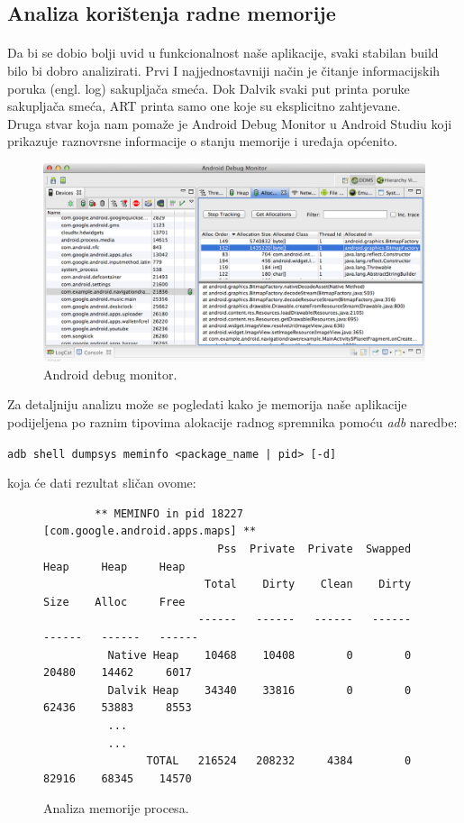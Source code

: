 \documentclass[times, utf8, zavrsni]{fer}
\begin{document}
\subsection{Analiza korištenja radne memorije}
\paragraph{}
Da bi se dobio bolji uvid u funkcionalnost naše aplikacije, svaki stabilan build bilo bi dobro analizirati.
Prvi I najjednostavniji način je čitanje informacijskih poruka (engl. log) sakupljača smeća. Dok Dalvik svaki put printa poruke sakupljača smeća, ART printa samo one koje su eksplicitno zahtjevane.\\

Druga stvar koja nam pomaže je Android Debug Monitor u Android Studiu koji prikazuje raznovrsne informacije o stanju memorije i uređaja općenito.\\

\begin{figure}[ht!]
\centering
\includegraphics[width=140mm]{img/android-debug-monitor.png}
\caption{Android debug monitor.}
\label{overflow}
\end{figure}

Za detaljniju analizu može se pogledati kako je memorija naše aplikacije podijeljena po raznim tipovima alokacije radnog spremnika pomoću \textit{adb} naredbe:

\begin{center}
\verb=adb shell dumpsys meminfo <package_name | pid> [-d]=
\end{center}
koja će dati rezultat sličan ovome:

\begin{figure}[ht!]
\centering
\begingroup
    \fontsize{9pt}{12pt}\selectfont
		\begin{verbatim}
		** MEMINFO in pid 18227 [com.google.android.apps.maps] **
		                   Pss  Private  Private  Swapped     Heap     Heap     Heap
		                 Total    Dirty    Clean    Dirty     Size    Alloc     Free
		                ------   ------   ------   ------   ------   ------   ------
		  Native Heap    10468    10408        0        0    20480    14462     6017
		  Dalvik Heap    34340    33816        0        0    62436    53883     8553
		  ...
		  ...
		        TOTAL   216524   208232     4384        0    82916    68345    14570
\end{verbatim}
\endgroup
\caption{Analiza memorije procesa.}
\label{overflow}
\end{figure}
\end{document}
